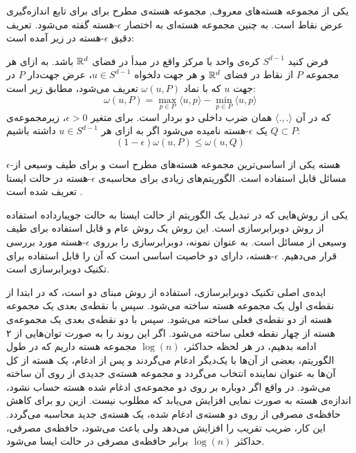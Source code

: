 
یکی از مجموعه‌ هسته‌های معروف, مجموعه‌ هسته‌ی مطرح برای برای تابع اندازه‌گیری عرض نقاط است. به چنین مجموعه هسته‌ای به اختصار $\epsilon$-هسته گفته می‌شود. تعریف دقیق $\epsilon$-هسته در زیر آمده است:


فرض کنید $S^{d-1}$ کره‌ی واحد با مرکز واقع در مبدأ در فضای $\mathbb{R}^d$ باشد. به ازای هر مجموعه $P$ از‌ نقاط در فضای $\mathbb{R}^d$ و هر جهت دلخواه $u \in S^{d-1}$، عرض جهت‌دار $P$ در جهت $u$ که با نماد $\omega(u, P)$ تعریف می‌شود، مطابق زیر است:
$$\omega(u, P) = \max_{p \in P} \langle u, p\rangle - \min_{p \in P} \langle u, p \rangle$$
که در آن $\langle ., . \rangle$ همان ضرب داخلی دو بردار است. برای متغیر $\epsilon > 0$، زیرمجموعه‌ی $Q \subset P$ یک $\epsilon$-هسته نامیده می‌شود اگر به ازای هر $u \in S^{d-1}$ داشته باشیم:
$$(1 - \epsilon) \omega(u, P) \leq \omega(u, Q)$$


$\epsilon$-هسته 
یکی از اساسی‌ترین مجموعه‌ هسته‌های مطرح است و برای طیف وسیعی از مسائل قابل استفاده است. الگوریتم‌های زیادی  برای محاسبه‌ی $\epsilon$-هسته در حالت ایستا تعریف شده است . 

یکی از روش‌هایی که در تبدیل یک الگوریتم از حالت ایستا به حالت جویبارداده استفاده از روش دوبرابرسازی است. این روش یک روش عام و قابل استفاده برای طیف وسیعی از مسائل است. به عنوان نمونه، دوبرابرسازی را برروی $\epsilon$-هسته مورد بررسی قرار می‌دهیم. $\epsilon$-هسته، دارای دو خاصیت اساسی است که آن را قابل استفاده برای تکنیک دوبرابرسازی است.





ایده‌ی اصلی تکنیک دوبرابرسازی، استفاده از روش مبنای دو است، که در ابتدا از نقطه‌ی اول یک مجموعه هسته ساخته می‌شود. سپس با نقطه‌ی بعدی یک مجموعه هسته از دو نقطه‌ی فعلی ساخته می‌شود. سپس با دو نقطه‌ی بعدی یک مجموعه‌ی هسته‌ از چهار نقطه فعلی ساخته می‌شود. اگر این روند را به صورت توان‌هایی از ۲ ادامه بدهیم، در هر لحظه حداکثر، $\log(n)$ مجموعه‌ هسته داریم که در طول الگوریتم، بعضی از آن‌ها با یک‌دیگر ادغام می‌گردند و پس از ادغام، یک هسته از کل آن‌ها به عنوان نماینده انتخاب می‌گردد و مجموعه هسته‌ی جدیدی از روی آن ساخته می‌شود. در واقع اگر دوباره بر روی دو مجموعه‌ی ادغام شده هسته حساب نشود، اندازه‌ی هسته به صورت نمایی افزایش‌ می‌یابد که مطلوب نیست. ازین رو برای کاهش حافظه‌ی مصرفی از روی دو هسته‌ی ادغام شده، یک هسته‌ی جدید محاسبه می‌گردد. این کار، ضریب تقریب را افزایش می‌دهد ولی باعث می‌شود، حافظه‌ی مصرفی، حداکثر $\log(n)$ برابر حافظه‌ی مصرفی در حالت ایسا می‌شود.